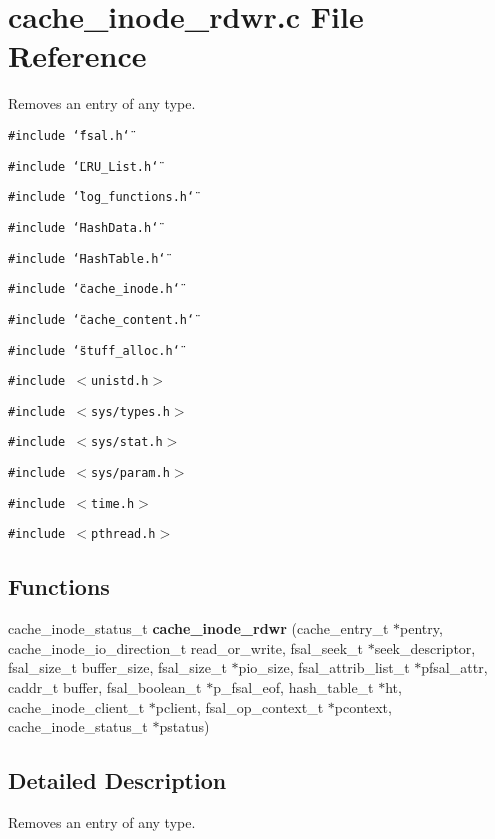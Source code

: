 \section{cache\_\-inode\_\-rdwr.c File Reference}
\label{cache__inode__rdwr_8c}
Removes an entry of any type. 

{\tt \#include \char`\"{}fsal.h\char`\"{}}\par
{\tt \#include \char`\"{}LRU\_\-List.h\char`\"{}}\par
{\tt \#include \char`\"{}log\_\-functions.h\char`\"{}}\par
{\tt \#include \char`\"{}Hash\-Data.h\char`\"{}}\par
{\tt \#include \char`\"{}Hash\-Table.h\char`\"{}}\par
{\tt \#include \char`\"{}cache\_\-inode.h\char`\"{}}\par
{\tt \#include \char`\"{}cache\_\-content.h\char`\"{}}\par
{\tt \#include \char`\"{}stuff\_\-alloc.h\char`\"{}}\par
{\tt \#include $<$unistd.h$>$}\par
{\tt \#include $<$sys/types.h$>$}\par
{\tt \#include $<$sys/stat.h$>$}\par
{\tt \#include $<$sys/param.h$>$}\par
{\tt \#include $<$time.h$>$}\par
{\tt \#include $<$pthread.h$>$}\par
\subsection*{Functions}
\begin{CompactItemize}
\item 
cache\_\-inode\_\-status\_\-t {\bf cache\_\-inode\_\-rdwr} (cache\_\-entry\_\-t $\ast$pentry, cache\_\-inode\_\-io\_\-direction\_\-t read\_\-or\_\-write, fsal\_\-seek\_\-t $\ast$seek\_\-descriptor, fsal\_\-size\_\-t buffer\_\-size, fsal\_\-size\_\-t $\ast$pio\_\-size, fsal\_\-attrib\_\-list\_\-t $\ast$pfsal\_\-attr, caddr\_\-t buffer, fsal\_\-boolean\_\-t $\ast$p\_\-fsal\_\-eof, hash\_\-table\_\-t $\ast$ht, cache\_\-inode\_\-client\_\-t $\ast$pclient, fsal\_\-op\_\-context\_\-t $\ast$pcontext, cache\_\-inode\_\-status\_\-t $\ast$pstatus)
\end{CompactItemize}


\subsection{Detailed Description}
Removes an entry of any type. 

